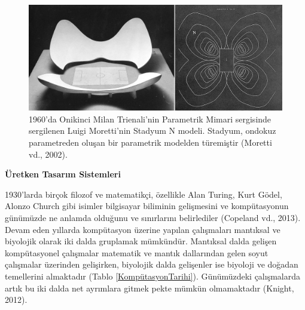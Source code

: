 \documentclass[12pt,turkish,a4paperpaper,]{report}
\begin{document}
\begin{figure}
\centering
\includegraphics{source/figures/stadium_N.jpg}
\caption{1960'da Onikinci Milan Trienali'nin Parametrik Mimari
sergisinde sergilenen Luigi Moretti'nin Stadyum N modeli. Stadyum,
ondokuz parametreden oluşan bir parametrik modelden türemiştir (Moretti
vd., 2002). \label{StadiumN}}
\end{figure}

\textbf{Üretken Tasarım Sistemleri}

1930'larda birçok filozof ve matematikçi, özellikle Alan Turing, Kurt
Gödel, Alonzo Church gibi isimler bilgisayar biliminin gelişmesini ve
kompütasyonun günümüzde ne anlamda olduğunu ve sınırlarını belirlediler
(Copeland vd., 2013). Devam eden yıllarda kompütasyon üzerine yapılan
çalışmaları mantıksal ve biyolojik olarak iki dalda gruplamak mümkündür.
Mantıksal dalda gelişen kompütasyonel çalışmalar matematik ve mantık
dallarından gelen soyut çalışmalar üzerinden gelişirken, biyolojik dalda
gelişenler ise biyoloji ve doğadan temellerini almaktadır (Tablo
\ref{KompütasyonTarihi}). Günümüzdeki çalışmalarda artık bu iki dalda
net ayrımlara gitmek pekte mümkün olmamaktadır (Knight, 2012).
\end{document}

